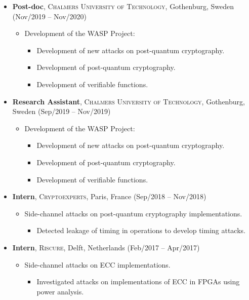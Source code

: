 \documentclass[11pt, a4paper]{article}
\begin{document}
\begin{itemize}
    \item \textbf{Post-doc}, \textsc{Chalmers University of Technology}, Gothenburg, Sweden (Nov/2019 -- Nov/2020)
    \begin{itemize}
        \item Development of the WASP Project:
        \begin{itemize}
            \item Development of new attacks on post-quantum cryptography.
            \item Development of post-quantum cryptography.
            \item Development of verifiable functions.
        \end{itemize}
    \end{itemize}

    \item \textbf{Research Assistant}, \textsc{Chalmers University of Technology}, Gothenburg, Sweden (Sep/2019 -- Nov/2019)
    \begin{itemize}
        \item Development of the WASP Project:
        \begin{itemize}
            \item Development of new attacks on post-quantum cryptography.
            \item Development of post-quantum cryptography.
            \item Development of verifiable functions.
        \end{itemize}
    \end{itemize}

    \item \textbf{Intern}, \textsc{Cryptoexperts}, Paris, France (Sep/2018 -- Nov/2018)
    \begin{itemize}
        \item Side-channel attacks on post-quantum cryptography implementations.
        \begin{itemize}
            \item Detected leakage of timing in operations to develop timing attacks.
        \end{itemize}
    \end{itemize}

    \item \textbf{Intern}, \textsc{Riscure}, Delft, Netherlands (Feb/2017 -- Apr/2017)
    \begin{itemize}
        \item Side-channel attacks on ECC implementations.
        \begin{itemize}
            \item Investigated attacks on implementations of ECC in FPGAs using power analysis.
        \end{itemize}
    \end{itemize}


\end{itemize}
\end{document}
